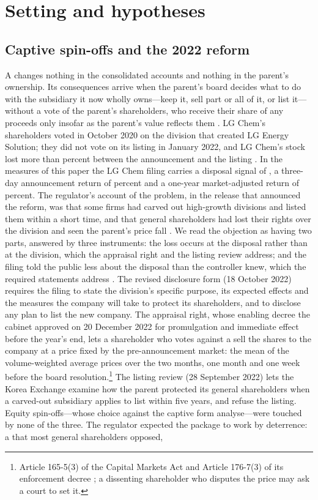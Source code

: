\section{Setting and hypotheses}\label{sec:setting}

\subsection{Captive spin-offs and the 2022 reform}\label{sec:captive}

A \captive{} changes nothing in the consolidated accounts and nothing in the parent's ownership. Its consequences arrive when the parent's board decides what to do with the subsidiary it now wholly owns---keep it, sell part or all of it, or list it---without a vote of the parent's shareholders, who receive their share of any proceeds only insofar as the parent's value reflects them \cite{kang2025}. LG Chem's shareholders voted in October 2020 on the division that created LG Energy Solution; they did not vote on its listing in January 2022, and LG Chem's stock lost more than \KLLGDrop{} percent between the announcement and the listing \cite{kang2025, park2022}. In the measures of this paper the LG Chem filing carries a disposal signal of \LGScore{}, a three-day announcement return of \LGAnnCar{} percent and a one-year market-adjusted return of \LGBhar{} percent. The regulator's account of the problem, in the release that announced the reform, was that some firms had carved out high-growth divisions and listed them within a short time, and that general shareholders had lost their rights over the division and seen the parent's price fall \cite{fsc2022a}. We read the objection as having two parts, answered by three instruments: the loss occurs at the disposal rather than at the division, which the appraisal right and the listing review address; and the filing told the public less about the disposal than the controller knew, which the required statements address \cite{fsc2022a, fsc2022b}. The revised disclosure form (18 October 2022) requires the filing to state the division's specific purpose, its expected effects and the measures the company will take to protect its shareholders, and to disclose any plan to list the new company. The appraisal right, whose enabling decree the cabinet approved on 20 December 2022 for promulgation and immediate effect before the year's end, lets a shareholder who votes against a \captive{} sell the shares to the company at a price fixed by the pre-announcement market: the mean of the volume-weighted average prices over the two months, one month and one week before the board resolution.\footnote{Article 165-5(3) of the Capital Markets Act and Article 176-7(3) of its enforcement decree \cite{fsc2022b}; a dissenting shareholder who disputes the price may ask a court to set it.} The listing review (28 September 2022) lets the Korea Exchange examine how the parent protected its general shareholders when a carved-out subsidiary applies to list within five years, and refuse the listing. Equity spin-offs---whose choice against the captive form  analyse---were touched by none of the three. The regulator expected the package to work by deterrence: a \captive{} that most general shareholders opposed, 
